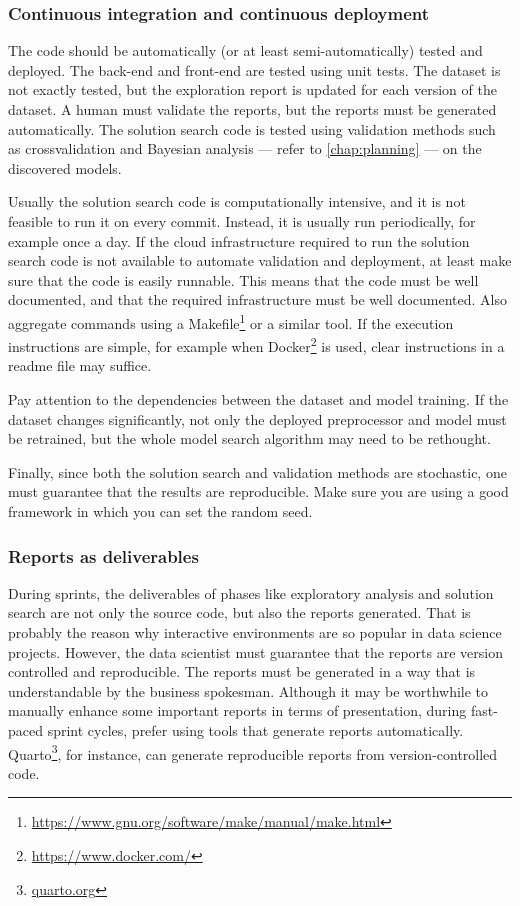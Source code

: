 \subsubsection{Continuous integration and continuous deployment}

The code should be
automatically (or at least semi-automatically) tested and deployed.  The back-end and
front-end are tested using unit tests.  The dataset is not exactly tested, but the
exploration report is updated for each version of the dataset.
A human must validate the reports, but the reports must be generated automatically.
The solution search code is tested using
validation methods such as \gls{crossvalidation} and Bayesian analysis --- refer to
\cref{chap:planning} --- on the discovered models.

Usually the solution search code is computationally intensive, and it is
not feasible to run it on every commit.  Instead, it is usually run periodically, for example
once a day.  If the cloud infrastructure required to run the solution search code is not
available to automate validation and deployment, at least make sure that the code is
easily runnable.  This means that the code must be well documented, and that the
required infrastructure must be well documented.  Also aggregate commands using a
Makefile\footnote{\url{https://www.gnu.org/software/make/manual/make.html}} or a similar tool.
If the execution instructions are simple, for example when
Docker\footnote{\url{https://www.docker.com/}} is used, clear instructions in a readme file
may suffice.

Pay attention to the dependencies between the dataset and
model training.  If the dataset changes significantly, not only the deployed \gls{preprocessor}
and model must be retrained, but the whole model search algorithm may need to be rethought.

Finally, since both the solution search and validation methods are stochastic, one
must guarantee that the results are reproducible.  Make sure you are using a good
framework in which you can set the random seed.

\subsubsection{Reports as deliverables}

During sprints, the deliverables of phases like exploratory analysis and solution search are
not only the source code, but also the reports generated.  That is probably the reason why
interactive environments are so popular in data science projects.  However, the data
scientist must guarantee that the reports are version controlled and reproducible.  The
reports must be generated in a way that is understandable by the business spokesman.
Although it may be worthwhile to manually enhance some important reports in terms of
presentation, during fast-paced sprint cycles, prefer using tools that generate reports
automatically. Quarto\footnote{\href{https://quarto.org/}{quarto.org}}, for instance, can
generate reproducible reports from version-controlled code.

